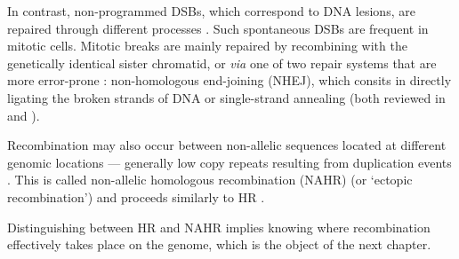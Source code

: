 In contrast, non-programmed DSBs, which correspond to DNA lesions, are repaired through different processes \citep[reviewed in][]{sung2006mechanism}.
Such spontaneous DSBs are frequent in mitotic cells.
Mitotic breaks are mainly repaired by recombining with the genetically identical sister chromatid, or \textit{via} one of two repair systems that are more error-prone \citep{smith2001influence}: non-homologous end-joining (NHEJ), which consits in directly ligating the broken strands of DNA \citep{weterings2004mechanism} or single-strand annealing (both reviewed in \citealp{helleday2003pathways} and \citealp{moynahan2010mitotic}).

Recombination may also occur between non-allelic sequences located at different genomic locations — generally low copy repeats resulting from duplication events \citep{bailey2006primate}. 
This is called non-allelic homologous recombination (NAHR) (or ‘ectopic recombination’) and proceeds similarly to HR \citep{sasaki2010genome}.


Distinguishing between HR and NAHR implies knowing where recombination effectively takes place on the genome, which is the object of the next chapter.




